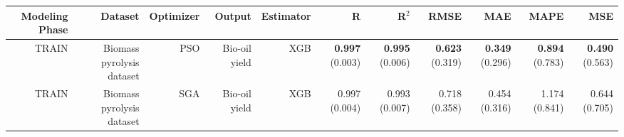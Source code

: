 \begin{table}
\centering
\label{eml___comparison_datasets_table_xgb_biomass_pyrolysis_dataset_train.tex}
\begin{tabular}{rrrrrrrrrrr}
\toprule
Modeling Phase &                   Dataset & Optimizer &        Output & Estimator &                    R &                R$^2$ &                 RMSE &                  MAE &                 MAPE &                  MSE \\
\midrule
         TRAIN & Biomass pyrolysis dataset &       PSO & Bio-oil yield &       XGB & { \bf 0.997} (0.003) & { \bf 0.995} (0.006) & { \bf 0.623} (0.319) & { \bf 0.349} (0.296) & { \bf 0.894} (0.783) & { \bf 0.490} (0.563) \\
         TRAIN & Biomass pyrolysis dataset &       SGA & Bio-oil yield &       XGB &        0.997 (0.004) &        0.993 (0.007) &        0.718 (0.358) &        0.454 (0.316) &        1.174 (0.841) &        0.644 (0.705) \\
\bottomrule
\end{tabular}
\end{table}
